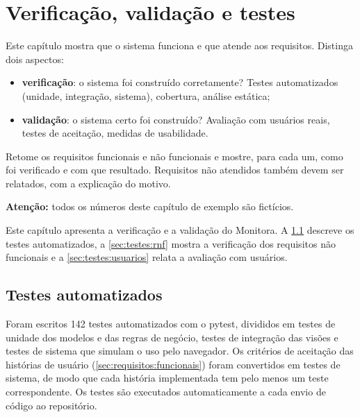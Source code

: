 \chapter{Verificação, validação e testes}
\label{cap:testes}

\begin{instrucao}
Este capítulo mostra que o sistema funciona e que atende aos requisitos.
Distinga dois aspectos:
\begin{itemize}
  \item \textbf{verificação}: o sistema foi construído corretamente? Testes
        automatizados (unidade, integração, sistema), cobertura, análise
        estática;
  \item \textbf{validação}: o sistema certo foi construído? Avaliação com
        usuários reais, testes de aceitação, medidas de usabilidade.
\end{itemize}
Retome os requisitos funcionais e não funcionais e mostre, para cada um, como
foi verificado e com que resultado. Requisitos não atendidos também devem ser
relatados, com a explicação do motivo.

\textbf{Atenção:} todos os números deste capítulo de exemplo são fictícios.
\end{instrucao}

Este capítulo apresenta a verificação e a validação do Monitora. A
\cref{sec:testes:automatizados} descreve os testes automatizados, a
\cref{sec:testes:rnf} mostra a verificação dos requisitos não funcionais e a
\cref{sec:testes:usuarios} relata a avaliação com usuários.

\section{Testes automatizados}
\label{sec:testes:automatizados}

Foram escritos 142 testes automatizados com o pytest, divididos em testes de
unidade dos modelos e das regras de negócio, testes de integração das visões
e testes de sistema que simulam o uso pelo navegador. Os critérios de
aceitação das histórias de usuário (\cref{sec:requisitos:funcionais}) foram
convertidos em testes de sistema, de modo que cada história implementada tem
pelo menos um teste correspondente. Os testes são executados automaticamente
a cada envio de código ao repositório.

